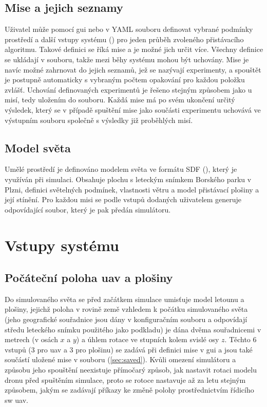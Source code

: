     \subsection{Mise a jejich seznamy}
      Uživatel může pomocí \acrshort{gui} nebo v YAML souboru definovat vybrané podmínky prostředí a další vstupy systému () pro jeden průběh zvoleného přistávacího algoritmu. Takové definici se říká mise a je možné jich určit více. Všechny definice se ukládají v souboru, takže mezi běhy systému mohou být uchovány. Mise je navíc možné zahrnovat do jejich seznamů, jež se nazývají experimenty, a spouštět je postupně automaticky s vybraným počtem opakování pro každou položku zvlášť. Uchování definovaných experimentů je řešeno stejným způsobem jako u misí, tedy uložením do souboru. Každá mise má po svém ukončení určitý výsledek, který se v případě spuštění mise jako součásti experimentu uchovává ve výstupním souboru společně s výsledky již proběhlých misí.
    \subsection{Model světa}
      Umělé prostředí je definováno modelem světa ve formátu SDF (\cite{sdf}), který je využíván při simulaci. Obsahuje plochu s leteckým snímkem Borského parku v Plzni, definici světelných podmínek, vlastnosti větru a model přistávací plošiny a její stínění. Pro každou misi se podle vstupů dodaných uživatelem generuje odpovídající soubor, který je pak předán simulátoru.

  \section{Vstupy systému} \label{sec:inputs}
    \subsection{Počáteční poloha \acrshort{uav} a plošiny}
      Do simulovaného světa se před začátkem simulace umisťuje model letounu a plošiny, jejichž poloha v rovině země vzhledem k počátku simulovaného světa (jeho geografické souřadnice jsou dány v konfiguračním souboru a odpovídají středu leteckého snímku použitého jako podkladu) je dána dvěma souřadnicemi v metrech (v osách $x$ a $y$) a úhlem rotace ve stupních kolem svislé osy $z$. Těchto 6 vstupů (3 pro \acrshort{uav} a 3 pro plošinu) se zadává při definici mise v \acrshort{gui} a jsou také součástí uložené mise v souboru (\cref{sec:saved}). Kvůli omezení simulátoru a způsobu jeho spouštění neexistuje přímočarý způsob, jak nastavit rotaci modelu dronu před spuštěním simulace, proto se rotoce nastavuje až za letu stejným způsobem, jakým se zadávají příkazy ke změně polohy prostřednictvím řídicího \acrshort{sw} \acrshort{uav}.
